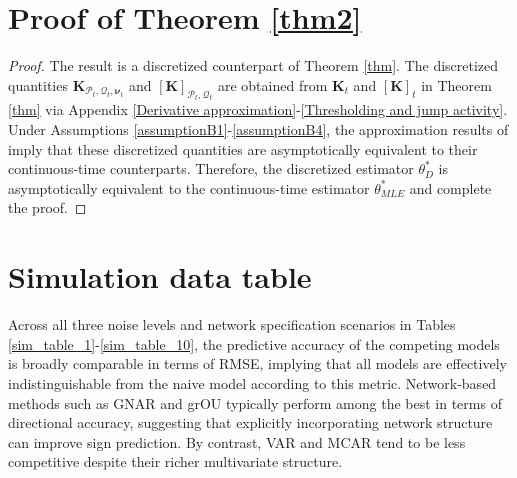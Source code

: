 \documentclass[12pt]{amsart}
\numberwithin{equation}{section}
\newcommand{\1}{\mathbf{1}}
\begin{document}
\section{Proof of Theorem \ref{thm2}}
\label{thm2_proof}
\begin{proof}
    The result is a discretized counterpart of Theorem \ref{thm}. The discretized quantities $\mathbf{K}_{\mathcal{P}_t,\mathcal{Q}_t,\bm{\nu}_t}$ and $[\mathbf{K}]_{\mathcal{P}_t,\mathcal{Q}_t}$ are obtained from $\mathbf{K}_t$ and $[\mathbf{K}]_t$ in Theorem \ref{thm} via Appendix \ref{Derivative approximation}-\ref{Thresholding and jump activity}. Under Assumptions \ref{assumptionB1}-\ref{assumptionB4}, the approximation results of \cite[Section 4 and Appendix D]{lucchese2026estimation} imply that these discretized quantities are asymptotically equivalent to their continuous-time counterparts. Therefore, the discretized estimator $\theta_D^*$ is asymptotically equivalent to the continuous-time estimator $\theta_{MLE}^*$ and complete the proof.
\end{proof}

\section{Simulation data table}
\label{Simulation data table}
Across all three noise levels and network specification scenarios in Tables \ref{sim_table_1}-\ref{sim_table_10}, the predictive accuracy of the competing models is broadly comparable in terms of RMSE, implying that all models are effectively indistinguishable from the naive model according to this metric. Network-based methods such as GNAR and grOU typically perform among the best in terms of directional accuracy, suggesting that explicitly incorporating network structure can improve sign prediction. By contrast, VAR and MCAR tend to be less competitive despite their richer multivariate structure.
\end{document}
